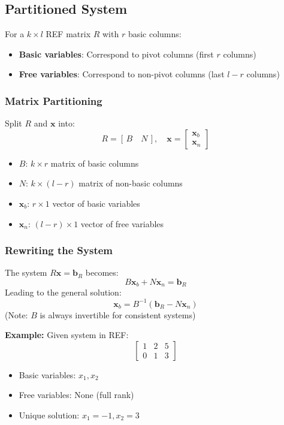 \documentclass{article}
\begin{document}
\subsection{Partitioned System} \label{sec:partitioned}
For a \( k \times l \) REF matrix \( R \) with \( r \) basic columns:
\begin{itemize}
    \item \textbf{Basic variables}: Correspond to pivot columns (first \( r \) columns)
    \item \textbf{Free variables}: Correspond to non-pivot columns (last \( l-r \) columns)
\end{itemize}

\subsubsection*{Matrix Partitioning}
Split \( R \) and \( \mathbf{x} \) into:
\[
R = [\, B \quad N \,], \quad 
\mathbf{x} = \begin{bmatrix} \mathbf{x}_b \\ \mathbf{x}_n \end{bmatrix}
\]
\begin{itemize}
    \item \( B \): \( k \times r \) matrix of basic columns
    \item \( N \): \( k \times (l-r) \) matrix of non-basic columns
    \item \( \mathbf{x}_b \): \( r \times 1 \) vector of basic variables
    \item \( \mathbf{x}_n \): \( (l-r) \times 1 \) vector of free variables
\end{itemize}

\subsubsection*{Rewriting the System}
The system \( R\mathbf{x} = \mathbf{b}_R \) becomes:
\[
B\mathbf{x}_b + N\mathbf{x}_n = \mathbf{b}_R
\]
Leading to the general solution:
\[
\mathbf{x}_b = B^{-1}(\mathbf{b}_R - N\mathbf{x}_n)
\]
(Note: \( B \) is always invertible for consistent systems)

\textbf{Example:}
Given system in REF:
\begin{equation*}
\left[\begin{array}{cc|c}
1 & 2 & 5 \\
0 & 1 & 3
\end{array}\right]
\end{equation*}
\begin{itemize}
    \item Basic variables: \( x_1, x_2 \)
    \item Free variables: None (full rank)
    \item Unique solution: \( x_1 = -1, x_2 = 3 \)
\end{itemize}
\end{document}

